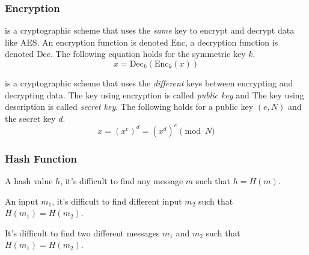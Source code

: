 \newcommand{\Enc}[2]{\text{Enc}_{#1}\left(#2\right)}
\newcommand{\Dec}[2]{\text{Dec}_{#1}\left(#2\right)}

\begin{frame}
  \frametitle{Encryption}

  \begin{description}
    \item<2->[Symmetric Key Encryption (SKE)]
    is a cryptographic scheme that uses the \emph{same} key to encrypt and
    decrypt data like AES.
    An encryption function is denoted $\text{Enc}$, a decryption function
    is denoted $\text{Dec}$. The following equation holds for the symmetric key $k$.
    \[
      x = \Dec{k}{\Enc{k}{x}}
    \]
    
    \item<3->[RSA Encryption]
    is a cryptographic scheme that uses the \emph{different} keys between encrypting and
    decrypting data. The key using encryption is called \emph{public key} and
    The key using description is called \emph{secret key}.
    The following holds for a public key $(e, N)$ and the secret key $d$.
    \[
      x = (x^e)^d = (x^d)^e \pmod{N}
    \]
  \end{description}
\end{frame}

\begin{frame}
  \frametitle{Hash Function}


  
  \begin{description}
    \item<4->[Preimage Resistance] A hash value $h$,
    it's difficult to find any message $m$ such that $h = H(m)$.

    \item<4->[Second Preimage Resistance] An input $m_1$,
    it's difficult to find different input $m_2$ such that $H(m_1) = H(m_2)$.

    \item<4->[Collision resistance] It's difficult to find
    two different messages $m_1$ and $m_2$ such that $H(m_1) = H(m_2)$.
  \end{description}
\end{frame}

